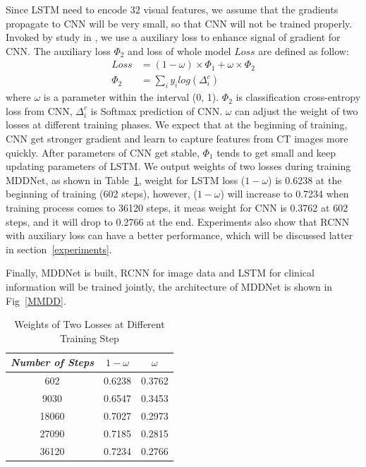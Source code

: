 \documentclass[journal]{IEEEtran}
\begin{document}
Since LSTM need to encode 32 visual features, we assume that the gradients propagate to CNN will be very small, so that CNN will not be trained properly. Invoked by study in \cite{szegedy2016rethinking}, we use a auxiliary loss to enhance signal of gradient for CNN.
The auxiliary loss $\Phi_2$ and loss of whole model $Loss$ are defined as follow: 
\begin{align*}
Loss &=  (1 - \omega) \times \Phi_1 +  \omega \times \Phi_2 \\
\Phi_2 &= \sum_i{y_i log(\Delta^c_i)}
\end{align*}
where $\omega$ is a parameter within the interval (0, 1). $\Phi_2$ is classification cross-entropy loss from CNN, $\Delta^c_i$ is Softmax prediction of CNN. $\omega$ can adjust the weight of two losses at different training phases.
We expect that at the beginning of training, CNN get stronger gradient and learn to capture features from CT images more quickly. After parameters of CNN get stable, $\Phi_1$ tends to get small and keep updating parameters of LSTM. We output weights of two losses during training MDDNet, as shown in Table~\ref{weights}, weight for LSTM loss ($1 - \omega$) is 0.6238 at the beginning of training (602 steps), however, ($1 - \omega$) will increase to 0.7234 when training process comes to 36120 steps, it meas weight for CNN is 0.3762 at 602 steps, and it will drop to 0.2766 at the end. Experiments also show that RCNN with auxiliary loss can have a better performance, which will be discussed latter in section~\ref{experiments}.

Finally, MDDNet is built, RCNN for image data and LSTM for clinical information will be trained jointly, the architecture of MDDNet is shown in Fig~\ref{MMDD}. 

\begin{table}[t]
    \vspace{-0cm}
    \caption{Weights of Two Losses at Different Training Step}
    \vspace{-0cm}
    \begin{center}
    \begin{tabular}{|c|c|c|}
    \hline
    \textbf{\textit{Number of Steps}} & \textbf{\textit{$1 - \omega$}} & \textbf{\textit{$\omega$}}\\
    \hline
    602 &0.6238 & 0.3762  \\
    9030 &0.6547 & 0.3453  \\
    18060 &0.7027 & 0.2973  \\
    27090 &0.7185 & 0.2815  \\
    36120 &0.7234 & 0.2766  \\

    \hline
    \end{tabular}
    \vspace{-0cm}
    \label{weights}
    \end{center}
    \vspace{-0cm}
    \end{table}
\end{document}
